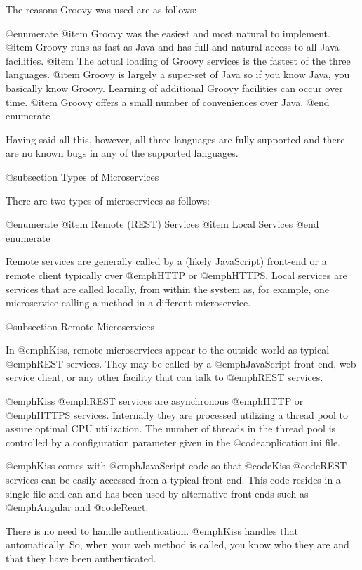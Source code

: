 The reasons Groovy was used are as follows:

@enumerate
@item
Groovy was the easiest and most natural to implement.
@item
Groovy runs as fast as Java and has full and natural access to all 
Java facilities.
@item
The actual loading of Groovy services is the fastest of the three languages.
@item
Groovy is largely a super-set of Java so if you know Java, you basically
know Groovy.  Learning of additional Groovy facilities can occur over
time.
@item
Groovy offers a small number of conveniences over Java.
@end enumerate

Having said all this, however, all three languages are fully supported
and there are no known bugs in any of the supported languages.

@subsection Types of Microservices

There are two types of microservices as follows:

@enumerate
@item
Remote (REST) Services
@item
Local Services
@end enumerate

Remote services are generally called by a (likely JavaScript)
front-end or a remote client typically over @emph{HTTP} or
@emph{HTTPS}.  Local services are services that are called locally,
from within the system as, for example, one microservice calling a
method in a different microservice.

@subsection Remote Microservices

In @emph{Kiss}, remote microservices appear to the outside world as
typical @emph{REST} services.  They may be called by a
@emph{JavaScript} front-end, web service client, or any other facility
that can talk to @emph{REST} services.

@emph{Kiss} @emph{REST} services are asynchronous @emph{HTTP} or
@emph{HTTPS} services.  Internally they are processed utilizing a
thread pool to assure optimal CPU utilization.  The number of threads
in the thread pool is controlled by a configuration parameter given in
the @code{application.ini} file.

@emph{Kiss} comes with @emph{JavaScript} code so that @code{Kiss}
@code{REST} services can be easily accessed from a typical front-end.
This code resides in a single file and can and has been used by
alternative front-ends such as @emph{Angular} and @code{React}.

There is no need to handle authentication.  @emph{Kiss} handles that
automatically.  So, when your web method is called, you know who
they are and that they have been authenticated.

